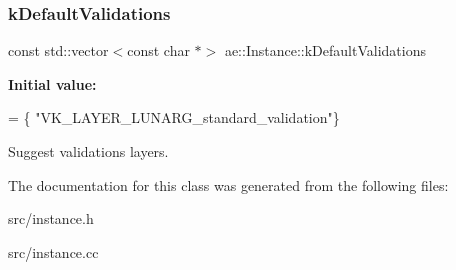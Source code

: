 \subsubsection{\texorpdfstring{k\+Default\+Validations}{kDefaultValidations}}
{\footnotesize\ttfamily const std\+::vector$<$const char $\ast$$>$ ae\+::\+Instance\+::k\+Default\+Validations}

{\bfseries Initial value\+:}
\begin{DoxyCode}
= \{
        \textcolor{stringliteral}{"VK\_LAYER\_LUNARG\_standard\_validation"}\}
\end{DoxyCode}


Suggest validations layers. 



The documentation for this class was generated from the following files\+:\begin{DoxyCompactItemize}
\item 
src/instance.\+h\item 
src/instance.\+cc\end{DoxyCompactItemize}
